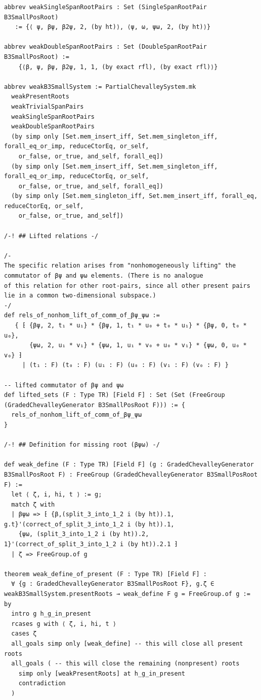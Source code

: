 \begin{Verbatim}
abbrev weakSingleSpanRootPairs : Set (SingleSpanRootPair B3SmallPosRoot)
   := {⟨ ψ, βψ, β2ψ, 2, (by ht)⟩, ⟨ψ, ω, ψω, 2, (by ht)⟩}

abbrev weakDoubleSpanRootPairs : Set (DoubleSpanRootPair B3SmallPosRoot) :=
    {⟨β, ψ, βψ, β2ψ, 1, 1, (by exact rfl), (by exact rfl)⟩}

abbrev weakB3SmallSystem := PartialChevalleySystem.mk
  weakPresentRoots
  weakTrivialSpanPairs
  weakSingleSpanRootPairs
  weakDoubleSpanRootPairs
  (by simp only [Set.mem_insert_iff, Set.mem_singleton_iff, forall_eq_or_imp, reduceCtorEq, or_self,
    or_false, or_true, and_self, forall_eq])
  (by simp only [Set.mem_insert_iff, Set.mem_singleton_iff, forall_eq_or_imp, reduceCtorEq, or_self,
    or_false, or_true, and_self, forall_eq])
  (by simp only [Set.mem_singleton_iff, Set.mem_insert_iff, forall_eq, reduceCtorEq, or_self,
    or_false, or_true, and_self])

/-! ## Lifted relations -/

/-
The specific relation arises from "nonhomogeneously lifting" the commutator of βψ and ψω elements. (There is no analogue
of this relation for other root-pairs, since all other present pairs lie in a common two-dimensional subspace.)
-/
def rels_of_nonhom_lift_of_comm_of_βψ_ψω :=
   { ⁅ {βψ, 2, t₁ * u₁} * {βψ, 1, t₁ * u₀ + t₀ * u₁} * {βψ, 0, t₀ * u₀},
       {ψω, 2, u₁ * v₁} * {ψω, 1, u₁ * v₀ + u₀ * v₁} * {ψω, 0, u₀ * v₀} ⁆
     | (t₁ : F) (t₀ : F) (u₁ : F) (u₀ : F) (v₁ : F) (v₀ : F) }

-- lifted commutator of βψ and ψω
def lifted_sets (F : Type TR) [Field F] : Set (Set (FreeGroup (GradedChevalleyGenerator B3SmallPosRoot F))) := {
  rels_of_nonhom_lift_of_comm_of_βψ_ψω
}

/-! ## Definition for missing root (βψω) -/

def weak_define (F : Type TR) [Field F] (g : GradedChevalleyGenerator B3SmallPosRoot F) : FreeGroup (GradedChevalleyGenerator B3SmallPosRoot F) :=
  let ⟨ ζ, i, hi, t ⟩ := g;
  match ζ with
  | βψω => ⁅ {β,(split_3_into_1_2 i (by ht)).1, g.t}'(correct_of_split_3_into_1_2 i (by ht)).1,
    {ψω, (split_3_into_1_2 i (by ht)).2, 1}'(correct_of_split_3_into_1_2 i (by ht)).2.1 ⁆
  | ζ => FreeGroup.of g

theorem weak_define_of_present (F : Type TR) [Field F] :
  ∀ {g : GradedChevalleyGenerator B3SmallPosRoot F}, g.ζ ∈ weakB3SmallSystem.presentRoots → weak_define F g = FreeGroup.of g := by
  intro g h_g_in_present
  rcases g with ⟨ ζ, i, hi, t ⟩
  cases ζ
  all_goals simp only [weak_define] -- this will close all present roots
  all_goals ( -- this will close the remaining (nonpresent) roots
    simp only [weakPresentRoots] at h_g_in_present
    contradiction
  )


\end{Verbatim}
